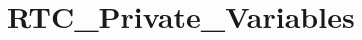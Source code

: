 \hypertarget{group___r_t_c___private___variables}{}\section{R\+T\+C\+\_\+\+Private\+\_\+\+Variables}
\label{group___r_t_c___private___variables}
